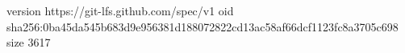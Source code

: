 version https://git-lfs.github.com/spec/v1
oid sha256:0ba45da545b683d9e956381d188072822cd13ac58af66dcf1123fc8a3705c698
size 3617
